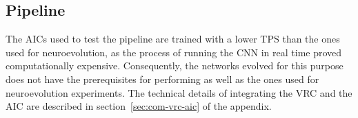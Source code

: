 \subsection{Pipeline}
The AICs used to test the pipeline are trained with a lower TPS than the ones used for neuroevolution, as the process of running the CNN in real time proved computationally expensive. Consequently, the networks evolved for this purpose
does not have the prerequisites for performing as well as the ones used for neuroevolution experiments. The technical details of integrating the VRC and the AIC are described in section~\ref{sec:com-vrc-aic} of the appendix.









































